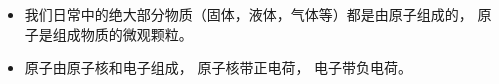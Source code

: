 
\begin{issues}
\issueDraft
\end{issues}

\begin{itemize}
\item 我们日常中的绝大部分物质（固体，液体，气体等）都是由原子组成的， 原子是组成物质的微观颗粒。
\item 原子由原子核和电子组成， 原子核带正电荷， 电子带负电荷。
\end{itemize}
